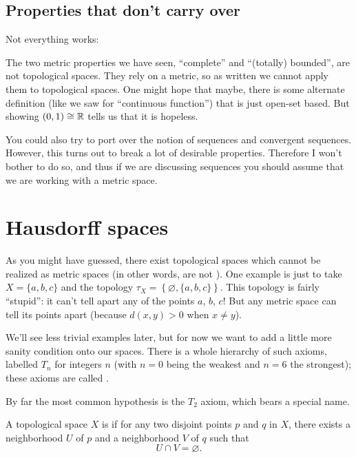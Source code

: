 \subsection{Properties that don't carry over}
Not everything works:

\begin{remark}
	The two metric properties we have seen,
	``complete'' and ``(totally) bounded'', are not topological spaces.
	They rely on a metric,
	so as written we cannot apply them to topological spaces.
	One might hope that maybe,
	there is some alternate definition (like we saw for ``continuous function'')
	that is just open-set based.
	But  showing $(0,1) \cong \mathbb R$
	tells us that it is hopeless.
\end{remark}

\begin{remark}
	You could also try to port over the notion
	of sequences and convergent sequences.
	However, this turns out to break a lot of desirable properties.
	Therefore I won't bother to do so,
	and thus if we are discussing sequences you should
	assume that we are working with a metric space.
\end{remark}

\section{Hausdorff spaces}

As you might have guessed,
there exist topological spaces which cannot be realized
as metric spaces (in other words, are not ).
One example is just to take $X = \{a,b,c\}$ and the topology
$\tau_X = \left\{ \varnothing, \{a,b,c\} \right\}$.
This topology is fairly ``stupid'':
it can't tell apart any of the points $a$, $b$, $c$!
But any metric space can tell its points apart (because $d(x,y) > 0$ when $x \neq y$).

We'll see less trivial examples later,
but for now we want to add a little more sanity condition onto our spaces.
There is a whole hierarchy of such axioms, labelled $T_n$ for
integers $n$ (with $n=0$ being the weakest and $n=6$ the strongest);
these axioms are called .

By far the most common hypothesis is the $T_2$ axiom,
which bears a special name.
\begin{definition}
	A topological space $X$ is  if
	for any two disjoint points $p$ and $q$ in $X$,
	there exists a neighborhood $U$ of $p$
	and a neighborhood $V$ of $q$ such that
	\[ U \cap V = \varnothing. \]
\end{definition}

